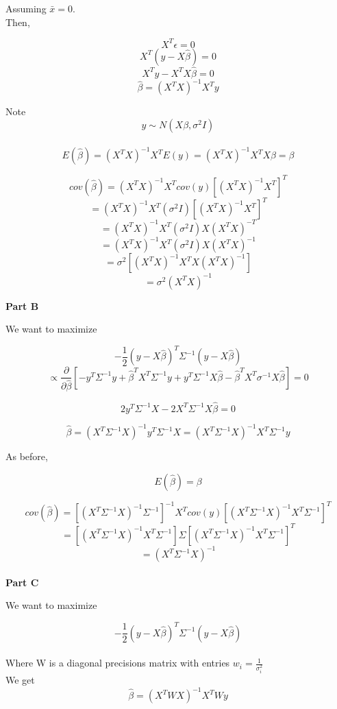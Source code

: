 \documentclass[12pt]{amsart}
\begin{document}
Assuming $\bar{x}=0$.\\


Then,

$$ X^T\epsilon =0$$
$$ X^T(y-X\hat{\beta}) =0$$
$$ X^Ty-X^TX\hat{\beta} =0$$
$$ \hat{\beta}  =(X^TX)^{-1} X^Ty$$

Note $$ y \sim N(X\beta, \sigma^2I)$$\\

$$ E(\hat{\beta}) = (X^TX)^{-1} X^TE(y) =(X^TX)^{-1} X^T X\beta = \beta$$



$$ cov(\hat{\beta}) = (X^TX)^{-1} X^Tcov(y)[(X^TX)^{-1}X^T]^{T}$$
$$ = (X^TX)^{-1} X^T(\sigma^2I)[(X^TX)^{-1}X^T]^{T}$$
$$ = (X^TX)^{-1} X^T(\sigma^2I)X(X^TX)^{-T}$$
$$ = (X^TX)^{-1} X^T(\sigma^2I)X(X^TX)^{-1}$$
$$ =\sigma^2 [(X^TX)^{-1} X^TX(X^TX)^{-1}]$$
$$ =\sigma^2(X^TX)^{-1}$$


{\bf Part B}\\
\bigskip
\bigskip

We want to maximize


$$ -\frac{1}{2}(y-X\hat{\beta})^T\Sigma^{-1}(y-X\hat{\beta}) $$
$$ \propto \frac{\partial}{\partial\hat{\beta}} [-y^T\Sigma^{-1}y+\hat{\beta}^TX^T\Sigma^{-1}y+y^T \Sigma^{-1}X\hat{\beta}-\hat{\beta}^TX^T\sigma^{-1}X\hat{\beta} ] = 0 $$

$$ 2y^T\Sigma^{-1}X-2X^T\Sigma^{-1}X\hat{\beta}=0$$

$$ \hat{\beta}=(X^T\Sigma^{-1}X)^{-1}y^T\Sigma^{-1}X =(X^T\Sigma^{-1}X)^{-1}X^T\Sigma^{-1}y $$

As before, 

$$ E(\hat{\beta}) = \beta$$


$$ cov(\hat{\beta}) = [(X^T\Sigma^{-1}X)^{-1}\Sigma^{-1}]^{-1} X^Tcov(y)[(X^T\Sigma^{-1}X)^{-1}X^T\Sigma^{-1}]^{T}$$
$$  = [(X^T\Sigma^{-1}X)^{-1}X^T\Sigma^{-1}] \Sigma[(X^T\Sigma^{-1}X)^{-1}X^T\Sigma^{-1}]^{T}$$
$$ = (X^T\Sigma^{-1}X)^{-1}$$\\
{\bf Part C}\\
\bigskip
\bigskip

We want to maximize


$$ -\frac{1}{2}(y-X\hat{\beta})^T\Sigma^{-1}(y-X\hat{\beta}) $$\\
Where W is a diagonal precisions matrix with entries $w_i = \frac{1}{\sigma_i^2}$\\


We get\\

$$ \hat{\beta} =(X^TWX)^{-1}X^TWy $$\\
\end{document}
